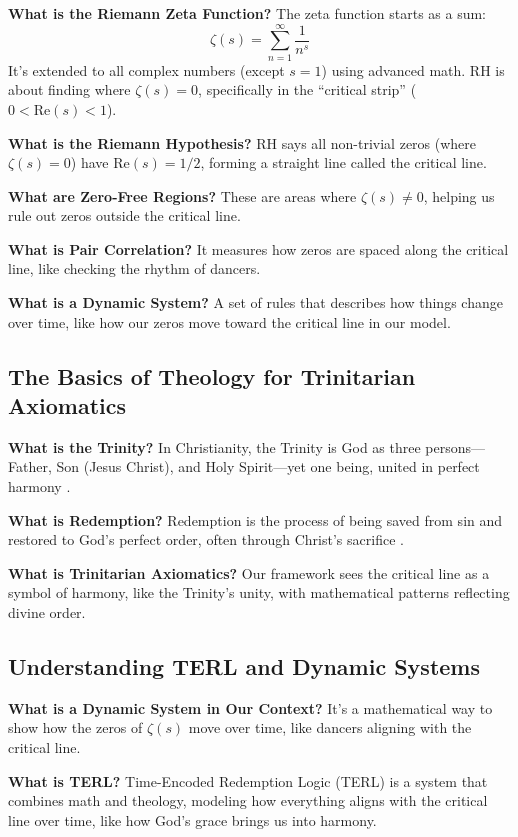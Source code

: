 \documentclass[12pt]{article}
\begin{document}
{{{\textbf{What is the Riemann Zeta Function?} The zeta function starts as a sum:
\[
\zeta(s) = \sum_{n=1}^\infty \frac{1}{n^s}
\]
It’s extended to all complex numbers (except \( s = 1 \)) using advanced math. RH is about finding where \(\zeta(s) = 0\), specifically in the “critical strip” (\( 0 < \text{Re}(s) < 1 \)).

\textbf{What is the Riemann Hypothesis?} RH says all non-trivial zeros (where \(\zeta(s) = 0\)) have \(\text{Re}(s) = 1/2\), forming a straight line called the critical line.

\textbf{What are Zero-Free Regions?} These are areas where \(\zeta(s) \neq 0\), helping us rule out zeros outside the critical line.

\textbf{What is Pair Correlation?} It measures how zeros are spaced along the critical line, like checking the rhythm of dancers.

\textbf{What is a Dynamic System?} A set of rules that describes how things change over time, like how our zeros move toward the critical line in our model.

\subsection{The Basics of Theology for Trinitarian Axiomatics}
\textbf{What is the Trinity?} In Christianity, the Trinity is God as three persons—Father, Son (Jesus Christ), and Holy Spirit—yet one being, united in perfect harmony \cite{Augustine426}.

\textbf{What is Redemption?} Redemption is the process of being saved from sin and restored to God’s perfect order, often through Christ’s sacrifice \cite{Colossians1}.

\textbf{What is Trinitarian Axiomatics?} Our framework sees the critical line as a symbol of harmony, like the Trinity’s unity, with mathematical patterns reflecting divine order.

\subsection{Understanding TERL and Dynamic Systems}
\textbf{What is a Dynamic System in Our Context?} It’s a mathematical way to show how the zeros of \(\zeta(s)\) move over time, like dancers aligning with the critical line.

\textbf{What is TERL?} Time-Encoded Redemption Logic (TERL) is a system that combines math and theology, modeling how everything aligns with the critical line over time, like how God’s grace brings us into harmony.

}}}
\end{document}
